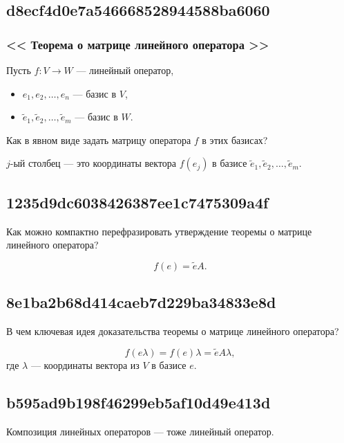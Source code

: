 \documentclass[11pt, a5paper]{article}
\newenvironment{note}[1]{\goodbreak\par\subsection{\hfill \color{lightgray}\tiny #1}}{}
\newenvironment{cloze}[2][\ldots]{\begin{leftbar}}{\end{leftbar}}
\newenvironment{icloze}[2][\ldots]{%
  \ignorespaces\text{\tiny \color{lightgray} \{\{c#2::}\hspace{0pt}%
}{%
  \hspace{0pt}\text{\tiny \color{lightgray}\}\}}\unskip%
}
\begin{document}
\begin{note}{d8ecf4d0e7a546668528944588ba6060}
    \subsubsection{<<\begin{icloze}{2}Теорема о матрице линейного оператора\end{icloze}>>}
    Пусть \( f : V \to W \) --- линейный оператор,
    \begin{itemize}
        \item {}\begin{icloze}{3}\( e_1, e_2, \ldots, e_n  \)\end{icloze} --- базис в \( V \),
        \item {}\begin{icloze}{3}\( \tilde e_1, \tilde e_2, \ldots, \tilde e_m  \)\end{icloze} --- базис в \( W \).
    \end{itemize}
    Как в явном виде задать матрицу оператора \( f \) в этих базисах?

    \begin{cloze}{1}
        \( j \)-ый столбец --- это координаты вектора \( f(e_j) \) в базисе \( \tilde e_1, \tilde e_2, \ldots, \tilde e_m \).
    \end{cloze}
\end{note}

\begin{note}{1235d9dc6038426387ee1c7475309a4f}
    Как можно компактно перефразировать утверждение теоремы о матрице линейного оператора?

    \begin{cloze}{1}
        \[
            f(e) = \tilde e A.
        \]
    \end{cloze}
\end{note}

\begin{note}{8e1ba2b68d414caeb7d229ba34833e8d}
    В чем ключевая идея доказательства теоремы о матрице линейного оператора?

    \begin{cloze}{1}
        \[
            f(e\lambda) = f(e)\lambda = \tilde e A \lambda,
        \]
        где \( \lambda \) --- координаты вектора из \( V \) в базисе \( e \).
    \end{cloze}
\end{note}

\begin{note}{b595ad9b198f46299eb5af10d49e413d}
    Композиция линейных операторов --- тоже \begin{icloze}{1}линейный оператор.\end{icloze}
\end{note}
\end{document}
